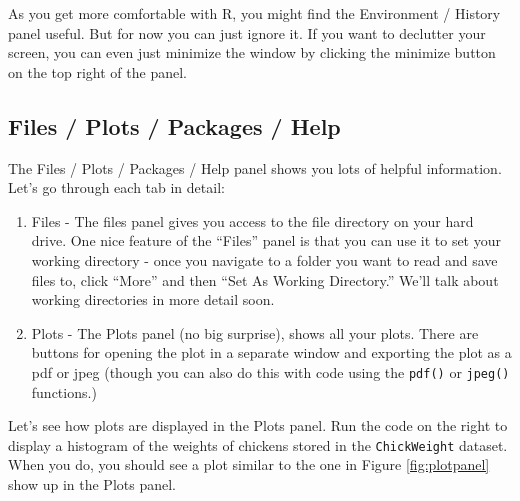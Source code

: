 \documentclass[]{book}
\newenvironment{Shaded}{\begin{snugshade}}{\end{snugshade}}
\newcommand{\KeywordTok}[1]{\textcolor[rgb]{0.13,0.29,0.53}{\textbf{{#1}}}}
\newcommand{\DataTypeTok}[1]{\textcolor[rgb]{0.13,0.29,0.53}{{#1}}}
\newcommand{\StringTok}[1]{\textcolor[rgb]{0.31,0.60,0.02}{{#1}}}
\newcommand{\NormalTok}[1]{{#1}}
\theoremstyle{definition}
\theoremstyle{definition}
\theoremstyle{remark}
\begin{document}
As you get more comfortable with R, you might find the Environment /
History panel useful. But for now you can just ignore it. If you want to
declutter your screen, you can even just minimize the window by clicking
the minimize button on the top right of the panel.

\subsection{Files / Plots / Packages /
Help}\label{files-plots-packages-help}

The Files / Plots / Packages / Help panel shows you lots of helpful
information. Let's go through each tab in detail:

\begin{enumerate}
\def\labelenumi{\arabic{enumi}.}
\item
  Files - The files panel gives you access to the file directory on your
  hard drive. One nice feature of the ``Files'' panel is that you can
  use it to set your working directory - once you navigate to a folder
  you want to read and save files to, click ``More'' and then ``Set As
  Working Directory.'' We'll talk about working directories in more
  detail soon.
\item
  Plots - The Plots panel (no big surprise), shows all your plots. There
  are buttons for opening the plot in a separate window and exporting
  the plot as a pdf or jpeg (though you can also do this with code using
  the \texttt{pdf()} or \texttt{jpeg()} functions.)
\end{enumerate}

Let's see how plots are displayed in the Plots panel. Run the code on
the right to display a histogram of the weights of chickens stored in
the \texttt{ChickWeight} dataset. When you do, you should see a plot
similar to the one in Figure \ref{fig:plotpanel} show up in the Plots
panel.

\begin{Shaded}
\end{Shaded}
\end{document}
